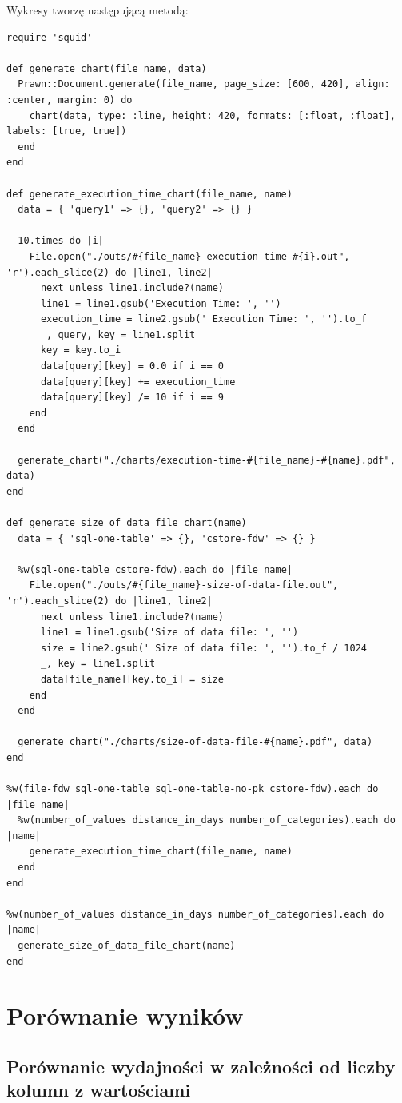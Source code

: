 \documentclass[a4paper,11pt]{article}
\begin{document}
Wykresy tworzę następującą metodą:
\begin{lstlisting}
require 'squid'

def generate_chart(file_name, data)
  Prawn::Document.generate(file_name, page_size: [600, 420], align: :center, margin: 0) do
    chart(data, type: :line, height: 420, formats: [:float, :float], labels: [true, true])
  end
end

def generate_execution_time_chart(file_name, name)
  data = { 'query1' => {}, 'query2' => {} }

  10.times do |i|
    File.open("./outs/#{file_name}-execution-time-#{i}.out", 'r').each_slice(2) do |line1, line2|
      next unless line1.include?(name)
      line1 = line1.gsub('Execution Time: ', '')
      execution_time = line2.gsub(' Execution Time: ', '').to_f
      _, query, key = line1.split
      key = key.to_i
      data[query][key] = 0.0 if i == 0
      data[query][key] += execution_time
      data[query][key] /= 10 if i == 9
    end
  end

  generate_chart("./charts/execution-time-#{file_name}-#{name}.pdf", data)
end

def generate_size_of_data_file_chart(name)
  data = { 'sql-one-table' => {}, 'cstore-fdw' => {} }

  %w(sql-one-table cstore-fdw).each do |file_name|
    File.open("./outs/#{file_name}-size-of-data-file.out", 'r').each_slice(2) do |line1, line2|
      next unless line1.include?(name)
      line1 = line1.gsub('Size of data file: ', '')
      size = line2.gsub(' Size of data file: ', '').to_f / 1024
      _, key = line1.split
      data[file_name][key.to_i] = size
    end
  end

  generate_chart("./charts/size-of-data-file-#{name}.pdf", data)
end

%w(file-fdw sql-one-table sql-one-table-no-pk cstore-fdw).each do |file_name|
  %w(number_of_values distance_in_days number_of_categories).each do |name|
    generate_execution_time_chart(file_name, name)
  end
end

%w(number_of_values distance_in_days number_of_categories).each do |name|
  generate_size_of_data_file_chart(name)
end
\end{lstlisting}


\section{Porównanie wyników}

\subsection{Porównanie wydajności w zależności od liczby kolumn z wartościami}
\end{document}
